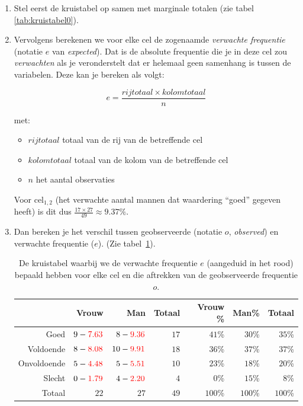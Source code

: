 \begin{enumerate}
  \item Stel eerst de kruistabel op samen met marginale totalen (zie tabel \ref{tab:kruistabel0}).
  \item Vervolgens berekenen we voor elke cel de zogenaamde \emph{verwachte frequentie} (notatie $e$ van \emph{expected}). Dat is de absolute frequentie die je in deze cel zou \emph{verwachten} als je veronderstelt dat er helemaal geen samenhang is tussen de variabelen. Deze kan je bereken als volgt:
  
  \begin{equation}
  e = \frac{rijtotaal \times kolomtotaal}{n}
  \end{equation}
  
  met:
  
  \begin{itemize}
    \item $rijtotaal$ totaal van de rij van de betreffende cel
    \item $kolomtotaal$ totaal van de kolom van de betreffende cel
    \item $n$ het aantal observaties
  \end{itemize}
  
  Voor cel$_{1,2}$ (het verwachte aantal mannen dat waardering ``goed'' gegeven heeft) is dit dus $\frac{17 \times 27}{49} \approx 9.37\%$.
  
  \item Dan bereken je het verschil tussen geobserveerde (notatie $o$, \emph{observed}) en verwachte frequentie ($e$). (Zie tabel~\ref{tab:kruistabel2}).
  
  \begin{table} \centering
    \begin{tabular}{@{}rrrrrrr@{}}
    	\toprule
    	            &                       Vrouw &                          Man & Totaal & Vrouw \% &   Man\% &  Totaal \\
    	\midrule
    	       Goed &  $9 -\textcolor{red}{7.63}$ &  $8 - \textcolor{red}{9.36}$ &   $17$ &   $41$\% &  $30$\% &  $35$\% \\
    	  Voldoende & $8 - \textcolor{red}{8.08}$ & $10 - \textcolor{red}{9.91}$ &   $18$ &   $36$\% &  $37$\% &  $37$\% \\
    	Onvoldoende & $5 - \textcolor{red}{4.48}$ &  $5 - \textcolor{red}{5.51}$ &   $10$ &   $23$\% &  $18$\% &  $20$\% \\
    	     Slecht & $0 - \textcolor{red}{1.79}$ &  $4 - \textcolor{red}{2.20}$ &    $4$ &    $0$\% &  $15$\% &   $8$\% \\
    	     Totaal &                        $22$ &                         $27$ &   $49$ &  $100$\% & $100$\% & $100$\% \\
    	\bottomrule
    \end{tabular}
    \caption{De kruistabel waarbij we de verwachte frequentie $e$ (aangeduid in het rood) bepaald hebben voor elke cel en die aftrekken van de geobserveerde frequentie $o$.}
    \label{tab:kruistabel2}
  \end{table}
  

\end{enumerate}

